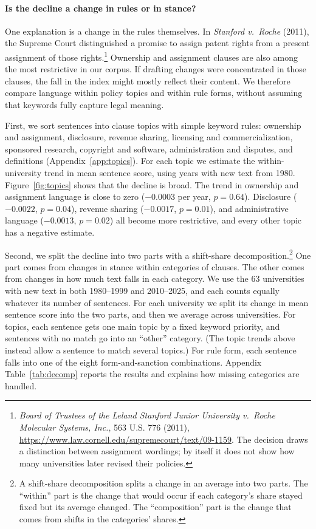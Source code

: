 \documentclass[11pt]{article}
\begin{document}
\paragraph{Is the decline a change in rules or in stance?} One explanation is a change in the rules themselves. In \emph{Stanford v.\ Roche} (2011), the Supreme Court distinguished a promise to assign patent rights from a present assignment of those rights.\footnote{\emph{Board of Trustees of the Leland Stanford Junior University v.\ Roche Molecular Systems, Inc.}, 563 U.S. 776 (2011), \url{https://www.law.cornell.edu/supremecourt/text/09-1159}. The decision draws a distinction between assignment wordings; by itself it does not show how many universities later revised their policies.} Ownership and assignment clauses are also among the most restrictive in our corpus. If drafting changes were concentrated in those clauses, the fall in the index might mostly reflect their content. We therefore compare language within policy topics and within rule forms, without assuming that keywords fully capture legal meaning.

First, we sort sentences into clause topics with simple keyword rules: ownership and assignment, disclosure, revenue sharing, licensing and commercialization, sponsored research, copyright and software, administration and disputes, and definitions (Appendix~\ref{app:topics}). For each topic we estimate the within-university trend in mean sentence score, using years with new text from 1980. Figure~\ref{fig:topics} shows that the decline is broad. The trend in ownership and assignment language is close to zero ($-0.0003$ per year, $p = 0.64$). Disclosure ($-0.0022$, $p = 0.04$), revenue sharing ($-0.0017$, $p = 0.01$), and administrative language ($-0.0013$, $p = 0.02$) all become more restrictive, and every other topic has a negative estimate.

Second, we split the decline into two parts with a shift-share decomposition.\footnote{A shift-share decomposition splits a change in an average into two parts. The ``within'' part is the change that would occur if each category's share stayed fixed but its average changed. The ``composition'' part is the change that comes from shifts in the categories' shares.} One part comes from changes in stance within categories of clauses. The other comes from changes in how much text falls in each category. We use the 63 universities with new text in both 1980--1999 and 2010--2025, and each counts equally whatever its number of sentences. For each university we split its change in mean sentence score into the two parts, and then we average across universities. For topics, each sentence gets one main topic by a fixed keyword priority, and sentences with no match go into an ``other'' category. (The topic trends above instead allow a sentence to match several topics.) For rule form, each sentence falls into one of the eight form-and-sanction combinations. Appendix Table~\ref{tab:decomp} reports the results and explains how missing categories are handled.
\end{document}
